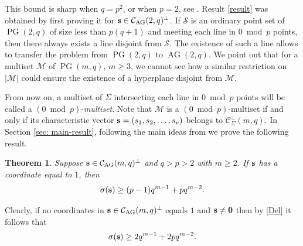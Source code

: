 \documentclass[12pt]{article}
\newcommand{\cC}{{\mathcal C}}
\newcommand{\cM}{{\mathcal M}}
\newcommand{\cS}{{\mathcal S}}
\newtheorem{theorem}{Theorem}[section]
\newtheorem{proposition}[theorem]{Proposition}
\DeclareMathOperator{\PG}{{PG}}
\DeclareMathOperator{\AG}{{AG}}
\begin{document}
	This bound is sharp when $q=p^2$, or when $p=2$, see \cite[Example 4.4]{5nomi}. Result \ref{result} was obtained by first proving it for ${\bf s} \in \cC_{\AG}(2,q)^\perp$. If $\cS$ is an ordinary point set of $\PG(2,q)$ of size less than $p(q+1)$ and meeting each line in $0 \bmod p$ points, then there always exists a line disjoint from $\cS$. The existence of such a line allows to transfer the problem from $\PG(2,q)$ to $\AG(2,q)$. We point out that for a multiset $\cM$ of $\PG(m,q)$, $m \geq 3$, we cannot see how a similar restriction on $|\cM|$ could ensure the existence of a hyperplane disjoint from $\cM$.
	
	From now on, a multiset of $\Sigma$ intersecting each line in $0 \bmod p$ points will be called a $(0 \bmod p)$-\textit{multiset}. Note that $\cM$ is a $(0 \bmod p)$-multiset if and only if its characteristic vector ${\bf s}=(s_1,s_2,\ldots,s_v)$ belongs to $\cC_{\Sigma}^\perp(m,q)$.
	In Section \ref{sec: main-result}, following the main ideas from \cite[Theorem 2.1]{5nomi} %
	we prove the following result.
	
	\begin{theorem}
		\label{codebound}
		Suppose ${\bf s}\in \cC_{\AG}(m,q)^\perp$ and $q> p>2$ with $m\geq 2$. If ${\bf s}$ has a coordinate equal to $1$, then
		\begin{equation}\label{affine_bound}
			\sigma({\bf s}) \geq    (p-1)q^{m-1}+pq^{m-2}.
		\end{equation}
	\end{theorem}
	
	Clearly, if no coordinates in ${\bf s} \in \cC_{\AG}(m,q)^\perp$ equals $1$ and ${\bf s}\neq {\bf 0}$ then by \eqref{Del} it follows that
	\begin{equation}\label{no-1}
		\sigma({\bf s}) \geq 2q^{m-1}+2p q^{m-2}.
	\end{equation}
	
		
\end{document}
